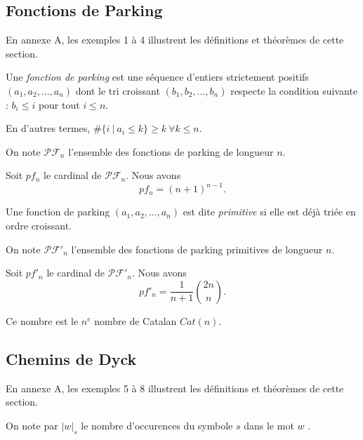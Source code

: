 
\subsection{Fonctions de Parking}

En annexe A, les exemples 1 à 4 illustrent les définitions et théorèmes
de cette section.

\begin{definition}
    Une \emph{fonction de parking} est une séquence d'entiers strictement
    positifs $(a_1, a_2, \ldots, a_n)$ dont le tri croissant
    $(b_1, b_2, \ldots, b_n)$ respecte la condition suivante :
    $b_i \leqslant i$ pour tout $i \leqslant n$.
\end{definition}

En d'autres termes, $\#\{i\ |\ a_i \leqslant k\} \geqslant k\ 
\forall k \leqslant n$.

On note $\mathcal{PF}_n$ l'ensemble des fonctions de parking de longueur $n$.

\begin{theorem}
    Soit $pf_n$ le cardinal de $\mathcal{PF}_n$.
    Nous avons $$pf_n = (n + 1)^{n-1}.$$
\end{theorem}

\begin{definition}
    Une fonction de parking $(a_1, a_2, \ldots, a_n)$ est dite
    \emph{primitive} si elle est déjà triée en ordre croissant.    
\end{definition}

On note $\mathcal{PF'}_n$ l'ensemble des fonctions de parking primitives
de longueur $n$.

\begin{theorem}[Stanley, 1999]
    Soit $pf'_n$ le cardinal de $\mathcal{PF'}_n$.
    Nous avons $$pf'_n = \frac{1}{n + 1} \binom{2n}{n}.$$
\end{theorem}

Ce nombre est le $n^{e}$ nombre de Catalan $Cat(n)$.

\subsection{Chemins de Dyck}

En annexe A, les exemples 5 à 8 illustrent les définitions et théorèmes
de cette section.

\begin{notation}
    On note par $|w|_s$ le nombre d'occurences du symbole $s$ dans
    le mot $w$ .
\end{notation}

